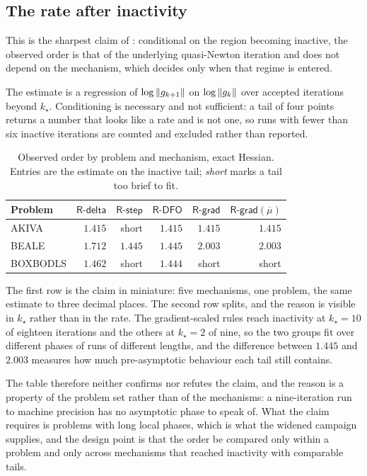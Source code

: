 \documentclass[11pt]{article}
\theoremstyle{plain}
\theoremstyle{definition}
\theoremstyle{remark}
\numberwithin{equation}{section}
\newcommand{\Rdelta}{\textsf{R-delta}}
\newcommand{\Rstep}{\textsf{R-step}}
\newcommand{\Rdfo}{\textsf{R-DFO}}
\newcommand{\Rgrad}{\textsf{R-grad}}
\begin{document}
\subsection{The rate after inactivity}
\label{sec: res rate}

This is the sharpest claim of \PartII: conditional on the region becoming
inactive, the observed order is that of the underlying quasi-Newton iteration and
does not depend on the mechanism, which decides only when that regime is entered.

The estimate is a regression of $\log\left \lVert g_{k+1} \right \rVert$ on $\log\left \lVert g_k \right \rVert$ over
accepted iterations beyond $k_\star$. Conditioning is necessary and not
sufficient: a tail of four points returns a number that looks like a rate and is
not one, so runs with fewer than six inactive iterations are counted and excluded
rather than reported.

\begin{table}[htbp]
  \centering
  \caption{Observed order by problem and mechanism, exact Hessian.\provisional{}
           Entries are the estimate on the inactive tail; \emph{short} marks a
           tail too brief to fit.}
  \label{tab: order v4}
  \small
  \begin{tabular}{@{}lrrrrr@{}}
    \toprule
    Problem & $\Rdelta$ & $\Rstep$ & $\Rdfo$ & $\Rgrad$ & $\Rgrad(\overline{\mu})$ \\
    \midrule
    AKIVA    & $1.415$ & short   & $1.415$ & $1.415$ & $1.415$ \\
    BEALE    & $1.712$ & $1.445$ & $1.445$ & $2.003$ & $2.003$ \\
    BOXBODLS & $1.462$ & short   & $1.444$ & short   & short   \\
    \bottomrule
  \end{tabular}
\end{table}

The first row is the claim in miniature: five mechanisms, one problem, the same
estimate to three decimal places. The second row splits, and the reason is
visible in $k_\star$ rather than in the rate. The gradient-scaled rules reach
inactivity at $k_\star = 10$ of eighteen iterations and the others at
$k_\star = 2$ of nine, so the two groups fit over different phases of runs of
different lengths, and the difference between $1.445$ and $2.003$ measures how
much pre-asymptotic behaviour each tail still contains.

The table therefore neither confirms nor refutes the claim, and the reason is a
property of the problem set rather than of the mechanisms: a nine-iteration run
to machine precision has no asymptotic phase to speak of. What the claim requires
is problems with long local phases, which is what the widened campaign supplies,
and the design point is that the order be compared only within a problem and only
across mechanisms that reached inactivity with comparable tails.\provisional
\end{document}
